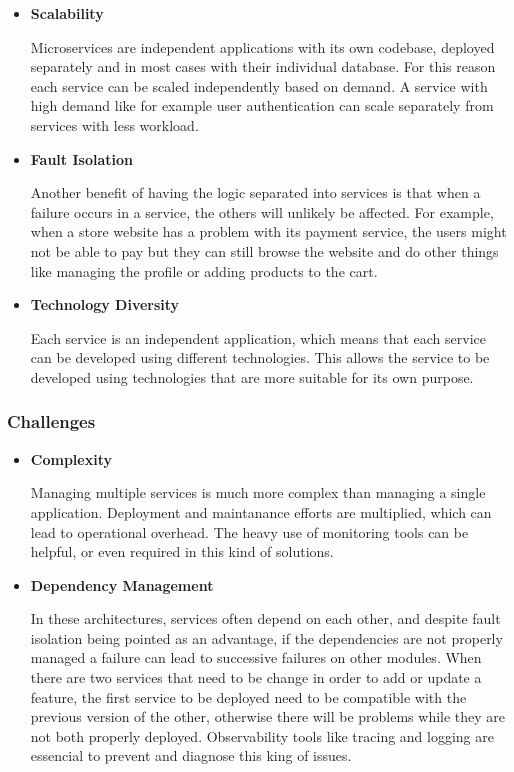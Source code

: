 \begin{itemize}
	\item \textbf{Scalability}

	      Microservices are independent applications with its own codebase, deployed
	      separately and in most cases with their individual database. For this reason
	      each service can be scaled independently based on demand. A service with
	      high demand like for example user authentication can scale separately from
	      services with less workload.

	\item \textbf{Fault Isolation}

	      Another benefit of having the logic separated into services is that when
	      a failure occurs in a service, the others will unlikely be affected. For
	      example, when a store website has a problem with its payment service, the
	      users might not be able to pay but they can still browse the website and
	      do other things like managing the profile or adding products to the cart.

	\item \textbf{Technology Diversity}

	      Each service is an independent application, which means that each service
	      can be developed using different technologies. This allows the service to
	      be developed using technologies that are more suitable for its own purpose.

\end{itemize}

\subsubsection{Challenges}
\begin{itemize}
	\item \textbf{Complexity}

	      Managing multiple services is much more complex than managing a single
	      application. Deployment and maintanance efforts are multiplied, which can
	      lead to operational overhead. The heavy use of monitoring tools can be
	      helpful, or even required in this kind of solutions.

	\item \textbf{Dependency Management}

	      In these architectures, services often depend on each other, and despite
	      fault isolation being pointed as an advantage, if the dependencies are not
	      properly managed a failure can lead to successive failures on other modules.
	      When there are two services that need to be change in order to add or update
	      a feature, the first service to be deployed need to be compatible with the
	      previous version of the other, otherwise there will be problems while they
	      are not both properly deployed.
	      Observability tools like tracing and logging are essencial to prevent and
	      diagnose this king of issues.
\end{itemize}


